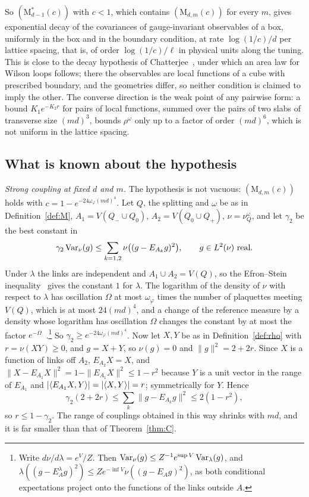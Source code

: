 So $(\mathrm M^*_{d-1}(c))$ with $c<1$, which contains $(\mathrm
M_{d,m}(c))$ for every $m$, gives exponential decay of the covariances of
gauge-invariant observables of a box, uniformly in the box and in the
boundary condition, at rate $\log(1/c)/d$ per lattice spacing, that is, of
order $\log(1/c)/\ell$ in physical units along the tuning. This is close to
the decay hypothesis of Chatterjee~\cite[Def.~2.3]{Cha21}, under which an
area law for Wilson loops follows; there the observables are local
functions of a cube with prescribed boundary, and the geometries differ, so
neither condition is claimed to imply the other. The converse direction is
the weak point of any pairwise form: a bound $K_1e^{-K_2r}$ for pairs of
local functions, summed over the pairs of two slabs of transverse size
$(md)^3$, bounds $\rho^\omega$ only up to a factor of order $(md)^6$, which
is not uniform in the lattice spacing.

\subsection{What is known about the hypothesis}

\emph{Strong coupling at fixed $d$ and $m$.} The hypothesis is not
vacuous: $(\mathrm M_{d,m}(c))$ holds with $c=1-e^{-24\omega_\varphi
(md)^4}$. Let $Q$, the splitting and $\omega$ be as in Definition~\ref{def:M},
$A_1=V(Q_-\cup Q_0)$, $A_2=V(Q_0\cup Q_+)$, $\nu=\nu^\omega_Q$, and let
$\gamma_2$ be the best constant in
\[
\gamma_2\operatorname{Var}_\nu(g)\le\sum_{k=1,2}\nu\bigl((g-E_{A_k}g)^2\bigr),\qquad g\in
L^2(\nu)\text{ real}.
\] Under $\lambda$ the links are independent
and $A_1\cup A_2=V(Q)$, so the Efron--Stein inequality~\cite{ES81} gives the
constant $1$ for $\lambda$. The logarithm of the density of $\nu$ with
respect to $\lambda$ has oscillation $\Omega$ at most $\omega_\varphi$ times
the number of plaquettes meeting $V(Q)$, which is at most $24(md)^4$, and a
change of the reference measure by a density whose logarithm has oscillation
$\Omega$ changes the constant by at most the factor
$e^{-\Omega}$~\cite{HS87}.\footnote{Write $d\nu/d\lambda=e^V/Z$. Then $\operatorname{Var}_\nu(g)\le
Z^{-1}e^{\sup V}\operatorname{Var}_\lambda(g)$, and $\lambda((g-E^\lambda_Ag)^2)\le
Ze^{-\inf V}\nu((g-E_Ag)^2)$, as both conditional expectations project onto
the functions of the links outside $A$.} So $\gamma_2\ge e^{-24\omega_\varphi
(md)^4}$. Now let $X,Y$ be as in Definition~\ref{def:rho} with
$r=\nu(XY)\ge0$, and $g=X+Y$, so $\nu(g)=0$ and $\|g\|^2=2+2r$. Since $X$ is a
function of links off $A_2$, $E_{A_2}X=X$, and $\|X-E_{A_1}X\|^2=1-
\|E_{A_1}X\|^2\le1-r^2$ because $Y$ is a unit vector in the range of $E_{A_1}$
and $|\langle E_{A_1}X,Y\rangle|=|\langle X,Y\rangle|=r$; symmetrically for $Y$. Hence
\[
\gamma_2(2+2r)\le\sum_k\|g-E_{A_k}g\|^2\le2(1-r^2),
\]
so $r\le1-\gamma_2$. The range of
couplings obtained in this way shrinks with $md$, and it is far smaller than
that of Theorem~\ref{thm:C}.


